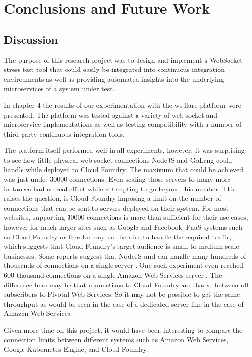 \chapter{Conclusions and Future Work}

\section{Discussion}

The purpose of this research project was to design and implement a WebSocket stress test tool that could easily be integrated into continuous integration environments as well as providing automated insights into the underlying microservices of a system under test.

In chapter 4 the results of our experimentation with the ws-flare platform were presented. The platform was tested against a variety of web socket and microservice implementations as well as testing compatibility with a number of third-party continuous integration tools. 

The platform itself performed well in all experiments, however, it was surprising to see how little physical web socket connections NodeJS and GoLang could handle while deployed to Cloud Foundry. The maximum that could be achieved was just under 30000 connections. Even scaling those servers to many more instances had no real effect while attempting to go beyond this number. This raises the question, is Cloud Foundry imposing a limit on the number of connections that can be sent to servers deployed on their system. For most websites, supporting 30000 connections is more than sufficient for their use cases, however for much larger sites such as Google and Facebook, PaaS systems such as Cloud Foundry or Heroku may not be able to handle the required traffic, which suggests that Cloud Foundry's target audience is small to medium scale businesses. Some reports suggest that NodeJS and can handle many hundreds of thousands of connections on a single server \cite{nodeConnections}. One such experiment even reached 600 thousand connections on a single Amazon Web Services server \cite{nodeConnections}. The difference here may be that connections to Cloud Foundry are shared between all subscribers to Pivotal Web Services. So it may not be possible to get the same throughput as would be seen in the case of a dedicated server like in the case of Amazon Web Services. 

Given more time on this project, it would have been interesting to compare the connection limits between different systems such as Amazon Web Services, Google Kubernetes Engine, and Cloud Foundry. 

